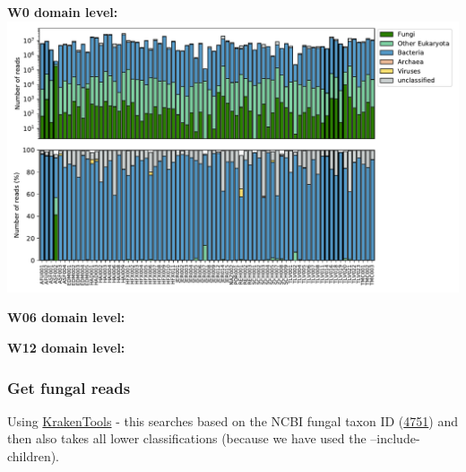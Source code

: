 \documentclass[
]{article}
\newenvironment{Shaded}{\begin{snugshade}}{\end{snugshade}}
\newcommand{\BuiltInTok}[1]{#1}
\newcommand{\ExtensionTok}[1]{#1}
\newcommand{\FunctionTok}[1]{\textcolor[rgb]{0.00,0.00,0.00}{#1}}
\newcommand{\KeywordTok}[1]{\textcolor[rgb]{0.13,0.29,0.53}{\textbf{#1}}}
\newcommand{\NormalTok}[1]{#1}
\newcommand{\StringTok}[1]{\textcolor[rgb]{0.31,0.60,0.02}{#1}}
\newcommand{\VariableTok}[1]{\textcolor[rgb]{0.00,0.00,0.00}{#1}}
\begin{document}
\textbf{W0 domain level:}
\includegraphics{Fungal-metagenome_files/figure-latex/W0_domain-1.pdf}

\textbf{W06 domain level:}

\textbf{W12 domain level:}

\hypertarget{get-fungal-reads}{%
\subsubsection{Get fungal reads}\label{get-fungal-reads}}

Using
\href{https://github.com/jenniferlu717/KrakenTools.git}{KrakenTools} -
this searches based on the NCBI fungal taxon ID
(\href{https://www.ncbi.nlm.nih.gov/Taxonomy/Browser/wwwtax.cgi?id=4751\&lvl=0}{4751})
and then also takes all lower classifications (because we have used the
--include-children).

\begin{Shaded}
\end{Shaded}
\end{document}

